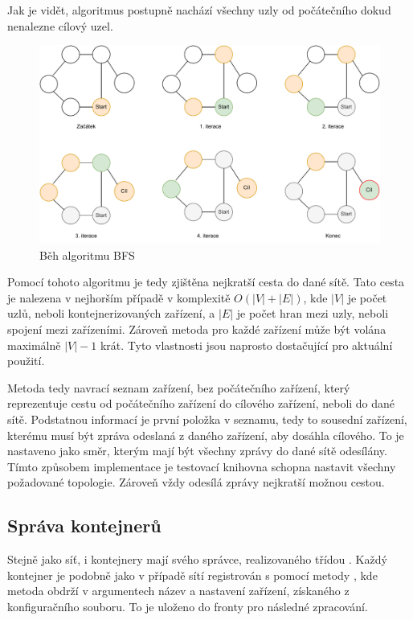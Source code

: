 Jak je vidět, algoritmus postupně nachází všechny uzly od počátečního dokud nenalezne cílový uzel. 

\begin{figure}[htbp]
    \centering 
    \includegraphics[width=\textwidth]{assets/img/bfs.pdf}
    \caption{Běh algoritmu BFS}
    \label{fig:bfs}
\end{figure}


Pomocí tohoto algoritmu je tedy zjištěna nejkratší cesta do dané sítě. Tato cesta je nalezena v nejhorším případě v komplexitě $O(|V| + |E|)$, kde $|V|$ je počet uzlů, neboli kontejnerizovaných zařízení, a $|E|$ je počet hran mezi uzly, neboli spojení mezi zařízeními. \cite{pruvodce_alogritmu} Zároveň metoda pro každé zařízení může být volána maximálně $|V| - 1$ krát. Tyto vlastnosti jsou naprosto dostačující pro aktuální použití.

Metoda tedy navrací seznam zařízení, bez počátečního zařízení, který reprezentuje cestu od počátečního zařízení do cílového zařízení, neboli do dané sítě. Podstatnou informací je první položka v seznamu, tedy to sousední zařízení, kterému musí být zpráva odeslaná z daného zařízení, aby dosáhla cílového. To je nastaveno jako směr, kterým mají být všechny zprávy do dané sítě odesílány. Tímto způsobem implementace je testovací knihovna schopna nastavit všechny požadované topologie. Zároveň vždy odesílá zprávy nejkratší možnou cestou.

\subsection{Správa kontejnerů}\label{sec:cont_managment}

Stejně jako síť, i kontejnery mají svého správce, realizovaného třídou . Každý kontejner je podobně jako v případě sítí registrován s pomocí metody , kde metoda obdrží v argumentech název a nastavení zařízení, získaného z konfiguračního souboru. To je uloženo do fronty pro následné zpracování.

